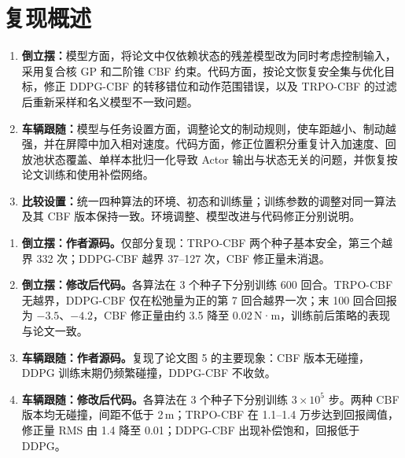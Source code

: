 \documentclass[UTF8,a4paper,zihao=-4,fontset=fandol]{ctexart}
\begin{document}
\nocite{*}

\section*{复现概述}
\begin{enumerate}[label=（\arabic*）,leftmargin=2.8em]
\item \textbf{倒立摆：}模型方面，将论文中仅依赖状态的残差模型改为同时考虑控制输入，采用复合核 GP 和二阶锥 CBF 约束。代码方面，按论文恢复安全集与优化目标，修正 DDPG-CBF 的转移错位和动作范围错误，以及 TRPO-CBF 的过滤后重新采样和名义模型不一致问题。
\item \textbf{车辆跟随：}模型与任务设置方面，调整论文的制动规则，使车距越小、制动越强，并在屏障中加入相对速度。代码方面，修正位置积分重复计入加速度、回放池状态覆盖、单样本批归一化导致 Actor 输出与状态无关的问题，并恢复按论文训练和使用补偿网络。
\item \textbf{比较设置：}统一四种算法的环境、初态和训练量；训练参数的调整对同一算法及其 CBF 版本保持一致。环境调整、模型改进与代码修正分别说明。
\end{enumerate}
\begin{enumerate}[label=（\arabic*）,leftmargin=2.8em]
\item \textbf{倒立摆：作者源码。}仅部分复现：TRPO-CBF 两个种子基本安全，第三个越界 332 次；DDPG-CBF 越界 37–127 次，CBF 修正量未消退。
\item \textbf{倒立摆：修改后代码。}各算法在 3 个种子下分别训练 600 回合。TRPO-CBF 无越界，DDPG-CBF 仅在松弛量为正的第 7 回合越界一次；末 100 回合回报为 $-3.5$、$-4.2$，CBF 修正量由约 3.5 降至 0.02\,N·m，训练前后策略的表现与论文一致。
\item \textbf{车辆跟随：作者源码。}复现了论文图 5 的主要现象：CBF 版本无碰撞，DDPG 训练末期仍频繁碰撞，DDPG-CBF 不收敛。
\item \textbf{车辆跟随：修改后代码。}各算法在 3 个种子下分别训练 $3\times10^5$ 步。两种 CBF 版本均无碰撞，间距不低于 2\,m；TRPO-CBF 在 1.1–1.4 万步达到回报阈值，修正量 RMS 由 1.4 降至 0.01；DDPG-CBF 出现补偿饱和，回报低于 DDPG。
\end{enumerate}
\end{document}
